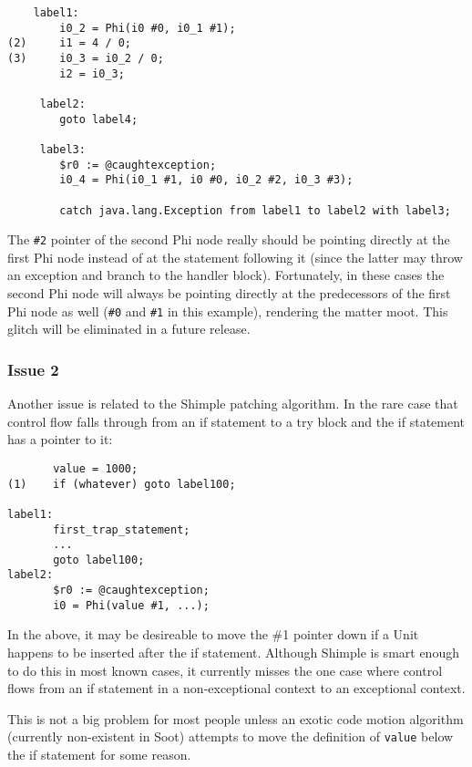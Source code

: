 \documentclass[10pt,letterpaper,oneside,onecolumn]{article}
\begin{document}
\begin{verbatim}
    label1:
        i0_2 = Phi(i0 #0, i0_1 #1);
(2)     i1 = 4 / 0;
(3)     i0_3 = i0_2 / 0;
        i2 = i0_3;

     label2:
        goto label4;

     label3:
        $r0 := @caughtexception;
        i0_4 = Phi(i0_1 #1, i0 #0, i0_2 #2, i0_3 #3);

        catch java.lang.Exception from label1 to label2 with label3;
\end{verbatim}

The {\tt \#2} pointer of the second Phi node really should be pointing
directly at the first Phi node instead of at the statement following
it (since the latter may throw an exception and branch to the handler
block).  Fortunately, in these cases the second Phi node will always
be pointing directly at the predecessors of the first Phi node as well
({\tt \#0} and {\tt \#1} in this example), rendering the matter moot.
This glitch will be eliminated in a future release.

\subsubsection{Issue 2}

Another issue is related to the Shimple patching algorithm.  In the
rare case that control flow falls through from an if statement to a
try block and the if statement has a pointer to it:

\begin{verbatim}
       value = 1000;
(1)    if (whatever) goto label100;

label1:
       first_trap_statement;
       ...
       goto label100;
label2:
       $r0 := @caughtexception;
       i0 = Phi(value #1, ...);
\end{verbatim}

In the above, it may be desireable to move the \#1 pointer down if a
Unit happens to be inserted after the if statement.  Although Shimple
is smart enough to do this in most known cases, it currently misses
the one case where control flows from an if statement in a
non-exceptional context to an exceptional context.

This is not a big problem for most people unless an exotic code motion
algorithm (currently non-existent in Soot) attempts to move the
definition of {\tt value} below the if statement for some reason.
\end{document}
